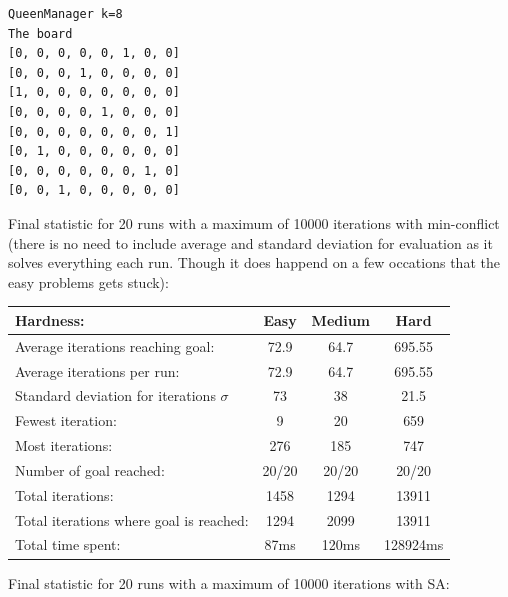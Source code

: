 \documentclass[12pt, a4paper]{article}
\begin{document}
\begin{verbatim}
QueenManager k=8
The board 
[0, 0, 0, 0, 0, 1, 0, 0]
[0, 0, 0, 1, 0, 0, 0, 0]
[1, 0, 0, 0, 0, 0, 0, 0]
[0, 0, 0, 0, 1, 0, 0, 0]
[0, 0, 0, 0, 0, 0, 0, 1]
[0, 1, 0, 0, 0, 0, 0, 0]
[0, 0, 0, 0, 0, 0, 1, 0]
[0, 0, 1, 0, 0, 0, 0, 0]

\end{verbatim}
\noindent
Final statistic for 20 runs with a maximum of 10000 iterations with min-conflict (there is no need to include average and standard deviation for evaluation as it solves everything each run. Though it does happend on a few occations that the easy problems gets stuck):\\
\begin{center}
  \begin{tabular}{| l | c c c|}
    \hline
    Hardness: &\textbf{Easy} & \textbf{Medium} & \textbf{Hard} \\ \hline
    Average iterations reaching goal: & 72.9& 64.7 & 695.55\\
    Average iterations per run:  & 72.9 & 64.7 & 695.55\\
    Standard deviation for iterations $\sigma$ & 73 & 38 & 21.5\\
    Fewest iteration: & 9 & 20& 659\\ 
    Most iterations: & 276 & 185& 747\\ 
    Number of goal reached: & 20/20 & 20/20 & 20/20\\
    Total iterations: & 1458 & 1294& 13911\\
    Total iterations where goal is reached: & 1294 & 2099& 13911\\
    Total time spent: & 87ms & 120ms & 128924ms\\
    \hline
  \end{tabular}
\end{center}
\noindent
Final statistic for 20 runs with a maximum of 10000 iterations with SA:\\
\end{document}
